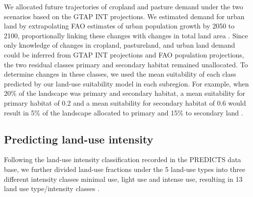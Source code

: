 \documentclass[titlesmallcaps,copyrightpage]{uomthesis}\usepackage[]{graphicx}\usepackage[]{color}
\begin{document}
We allocated future trajectories of cropland and pasture demand under the two scenarios based on the GTAP INT projections. We estimated demand for urban land by extrapolating FAO estimates of urban population growth by 2050 \citep{fao_faostat_2017} to 2100, proportionally linking these changes with changes in total land area \citep{kapitza_assessing_2021}. Since only knowledge of changes in cropland, pastureland, and urban land demand could be inferred from GTAP INT projections and FAO population projections, the two residual classes primary and secondary habitat remained unallocated. To determine changes in these classes, we used the mean suitability of each class predicted by our land-use suitability model in each subregion. For example, when 20\% of the landscape was primary and secondary habitat, a mean suitability for primary habitat of 0.2 and a mean suitability for secondary habitat of 0.6 would result in 5\% of the landscape allocated to primary and 15\% to secondary land \citep{kapitza_assessing_2021}.

\subsection{Predicting land-use intensity}

Following the land-use intensity classification recorded in the PREDICTS data base, we further divided land-use fractions under the 5 land-use types into three different intensity classes minimal use, light use and intense use, resulting in 13 land use type/intensity classes \citep[][pasture and urban were divided into two intensity classes only, see  for land-use type/intensity classes]{hudson_predicts_2014}.
\end{document}
